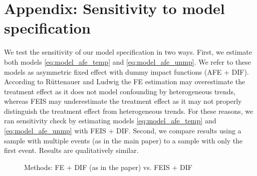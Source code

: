 \clearpage
\section{Appendix: Sensitivity to model specification}\label{sec:sensitivity_model}
\setcounter{table}{0}
\setcounter{figure}{0}
\renewcommand*\thetable{\Alph{section}.\arabic{table}}
\renewcommand*\thefigure{\Alph{section}.\arabic{figure}}
\renewcommand{\theHfigure}{\Alph{section}.\arabic{table}}
\renewcommand{\theHtable}{\Alph{section}.\arabic{figure}}

We test the sensitivity of our model specification in two ways.  First, we estimate both models \ref{eq:model_afe_temp} and \ref{eq:model_afe_unmp}.  We refer to these models as asymmetric fixed effect with dummy impact functions (AFE + DIF).  According to Rüttenauer and Ludwig \citeyearpar{ruttenauer_fixed_2020} the FE estimation may overestimate the treatment effect as it does not model confounding by heterogeneous trends, whereas FEIS may underestimate the treatment effect as it may not properly distinguish the treatment effect from heterogeneous trends. For these reasons, we ran sensitivity check by estimating models \ref{eq:model_afe_temp} and \ref{eq:model_afe_unmp} with FEIS + DIF.  Second, we compare results using a sample with multiple events (as in the main paper) to a sample with only the first event.  Results are qualitatively similar.


\begin{figure}
    \caption{Methods: FE + DIF (as in the paper) vs. FEIS + DIF}
    \label{graph_compare_model_feis}
\end{figure}

